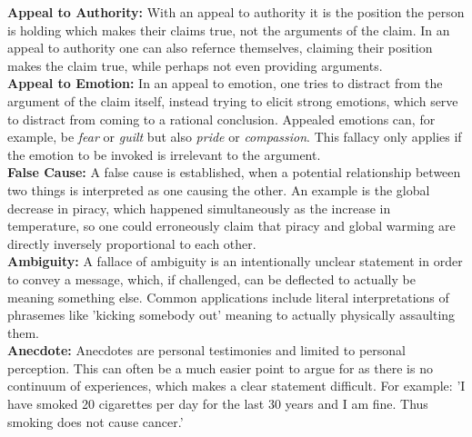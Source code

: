 \documentclass{article}
\begin{document}
	\textbf{Appeal to Authority:} With an appeal to authority it is the position the person is holding which makes their claims true, not the arguments of the claim. In an appeal to authority one can also refernce themselves, claiming their position makes the claim true, while perhaps not even providing arguments.\\

	\textbf{Appeal to Emotion:} In an appeal to emotion, one tries to distract from the argument of the claim itself, instead trying to elicit strong emotions, which serve to distract from coming to a rational conclusion. Appealed emotions can, for example, be \textit{fear} or \textit{guilt} but also \textit{pride} or \textit{compassion}. This fallacy only applies if the emotion to be invoked is irrelevant to the argument.\\

	\textbf{False Cause:} A false cause is established, when a potential relationship between two things is interpreted as one causing the other. An example is the global decrease in piracy, which happened simultaneously as the increase in temperature, so one could erroneously claim that piracy and global warming are directly inversely proportional to each other.\\

	\textbf{Ambiguity:} A fallace of ambiguity is an intentionally unclear statement in order to convey a message, which, if challenged, can be deflected to actually be meaning something else. Common applications include literal interpretations of phrasemes like 'kicking somebody out' meaning to actually physically assaulting them.\\

	\textbf{Anecdote:} Anecdotes are personal testimonies and limited to personal perception. This can often be a much easier point to argue for as there is no continuum of experiences, which makes a clear statement difficult. For example: 'I have smoked 20 cigarettes per day for the last 30 years and I am fine. Thus smoking does not cause cancer.'\\
	
\end{document}
